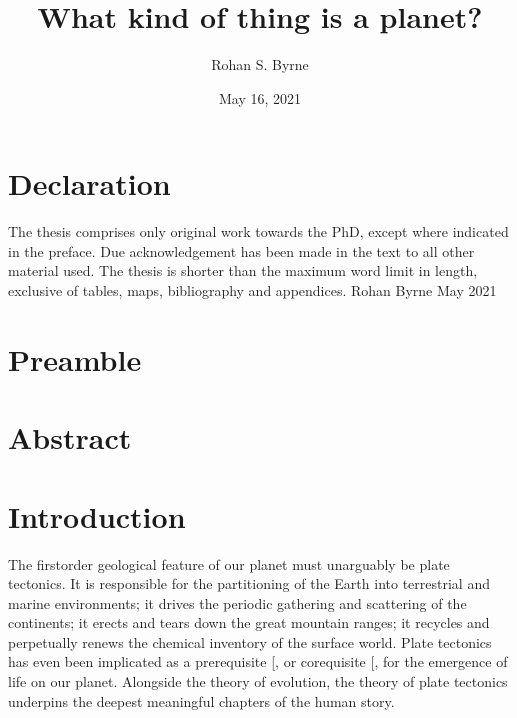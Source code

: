 \documentclass[letterpaper,10pt,english]{jupyterBook}
\title{What kind of thing is a planet?}
\date{May 16, 2021}
\author{Rohan S.\@{} Byrne}
\begin{document}
\pagestyle{empty}
\sphinxmaketitle
\pagestyle{plain}
\sphinxtableofcontents
\pagestyle{normal}
\label{\detokenize{index::doc}}


\sphinxAtStartPar
{}


\chapter{Declaration}
\label{\detokenize{frontmatter/declaration:declaration}}\label{\detokenize{frontmatter/declaration::doc}}
\sphinxAtStartPar
The thesis comprises only original work towards the PhD, except where indicated in the preface. Due acknowledgement has been made in the text to all other material used. The thesis is shorter than the maximum word limit in length, exclusive of tables, maps, bibliography and appendices.
Rohan Byrne
May 2021


\chapter{Preamble}
\label{\detokenize{frontmatter/preamble:preamble}}\label{\detokenize{frontmatter/preamble::doc}}

\chapter{Abstract}
\label{\detokenize{frontmatter/abstract:abstract}}\label{\detokenize{frontmatter/abstract::doc}}

\chapter{Introduction}
\label{\detokenize{frontmatter/introduction:introduction}}\label{\detokenize{frontmatter/introduction::doc}}
\sphinxAtStartPar
The first\sphinxhyphen{}order geological feature of our planet must unarguably be plate tectonics. It is responsible for the partitioning of the Earth into terrestrial and marine environments; it drives the periodic gathering and scattering of the continents; it erects and tears down the great mountain ranges; it recycles and perpetually renews the chemical inventory of the surface world. Plate tectonics has even been implicated as a prerequisite {[}, \sphinxcite{references:id417}{]} or co\sphinxhyphen{}requisite {[}, \sphinxcite{references:id435}{]} for the emergence of life on our planet. Alongside the theory of evolution, the theory of plate tectonics underpins the deepest meaningful chapters of the human story.
\end{document}
